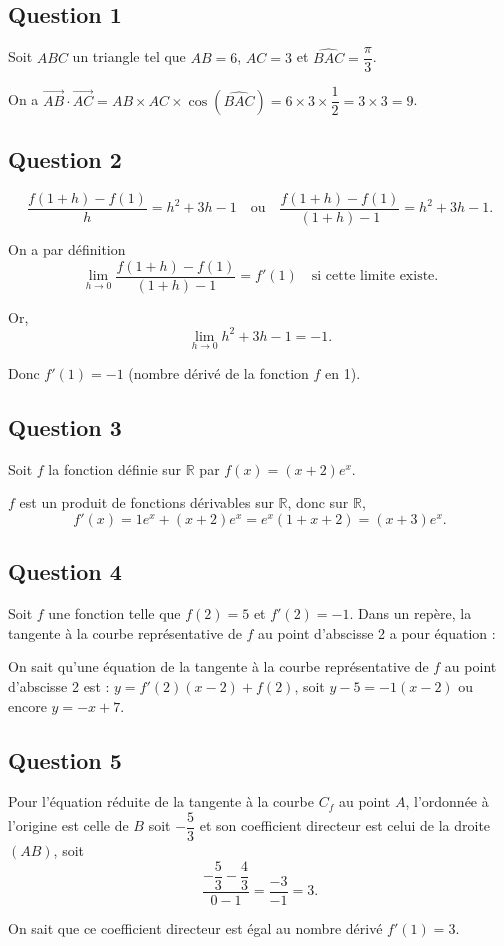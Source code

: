 \subsection*{Question 1}
	
	Soit \(ABC\) un triangle tel que \(AB = 6\), \(AC = 3\) et \(\widehat{ BAC} = \dfrac{\pi}{3}\).
	
	On a \(\overrightarrow{AB} \cdot \overrightarrow{AC} = AB \times AC \times \cos(\widehat{BAC}) = 6 \times 3 \times \dfrac{1}{2} = 3 \times 3 = 9\).
	
	\subsection*{Question 2}
	
	\[
	\dfrac{f(1+h) - f(1)}{h} = h^2 + 3h - 1 \quad \text{ou} \quad \dfrac{f(1+h) - f(1)}{(1+h)-1} = h^2 + 3h - 1.
	\]
	
	On a par définition
	\[
	\lim_{h \to 0} \dfrac{f(1+h) - f(1)}{(1+h)-1} = f'(1) \quad \text{si cette limite existe}.
	\]
	
	Or,
	\[
	\lim_{h \to 0} h^2 + 3h - 1 = -1.
	\]
	
	Donc \(f'(1) = -1\) (nombre dérivé de la fonction \(f\) en 1).
	
	\subsection*{Question 3}
	
	Soit \(f\) la fonction définie sur \(\mathbb{R}\) par \(f(x) = (x + 2)e^x\).
	
	\(f\) est un produit de fonctions dérivables sur \(\mathbb{R}\), donc sur \(\mathbb{R}\),
	\[
	f'(x) = 1e^x + (x + 2)e^x = e^x (1 + x + 2) = (x + 3)e^x.
	\]
	
	\subsection*{Question 4}
	
	Soit \(f\) une fonction telle que \(f(2) = 5\) et \(f'(2) = -1\). Dans un repère, la tangente à la courbe représentative de \(f\) au point d’abscisse 2 a pour équation :
	
	On sait qu’une équation de la tangente à la courbe représentative de \(f\) au point d’abscisse 2 est :
$y  = f'(2)(x - 2)+f(2)$, soit  $y - 5 = -1(x - 2)$ ou encore $y = -x + 7$.
	
	
	\subsection*{Question 5}
	
	
	Pour l’équation réduite de la tangente à la courbe \(C_f\) au point \(A\), l’ordonnée à l’origine est celle de \(B\) soit \(-\dfrac{5}{3}\) et son coefficient directeur est celui de la droite \((AB)\), soit
	\[
	\dfrac{-\dfrac{5}{3} - \dfrac{4}{3}}{0 - 1} = \dfrac{-3}{-1} = 3.
	\]
	
	On sait que ce coefficient directeur est égal au nombre dérivé \(f'(1) = 3\).
